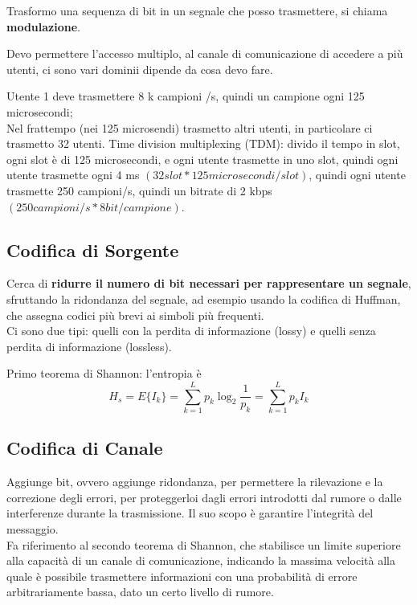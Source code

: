 Trasformo una sequenza di bit in un segnale che posso trasmettere, si chiama \textbf{modulazione}.

Devo permettere l'accesso multiplo, al canale di comunicazione di accedere a più utenti, 
ci sono vari dominii dipende da cosa devo fare. 

Utente 1 deve trasmettere 8 k campioni /s, quindi un campione ogni 125 microsecondi;\\
Nel frattempo (nei 125 microsendi) trasmetto altri utenti, in particolare ci trasmetto 32 utenti.
Time division multiplexing (TDM): divido il tempo in slot, ogni slot è di 125 microsecondi,
e ogni utente trasmette in uno slot, quindi ogni utente trasmette ogni 4 ms $(32 slot * 125 microsecondi/slot)$,
quindi ogni utente trasmette 250 campioni/s, quindi un bitrate di 2 kbps $(250 campioni/s * 8 bit/campione)$.

\subsection{Codifica di Sorgente}
Cerca di \textbf{ridurre il numero di bit necessari per rappresentare un segnale}, sfruttando la
ridondanza del segnale, ad esempio usando la codifica di Huffman, che assegna codici più 
brevi ai simboli più frequenti.\\

Ci sono due tipi: quelli con la perdita di informazione (lossy) e quelli senza perdita 
di informazione (lossless).

Primo teorema di Shannon: l'entropia è 
$$H_s=E\{I_k\}=\sum_{k=1}^{L} p_k \log_2 \frac{1}{p_k}= \sum_{k=1}^{L} p_k I_k$$

\subsection{Codifica di Canale}
Aggiunge bit, ovvero aggiunge ridondanza, per permettere la rilevazione e la 
correzione degli errori, per proteggerloi dagli errori introdotti dal rumore o dalle 
interferenze durante la trasmissione. Il suo scopo è garantire l'integrità del messaggio.\\

Fa riferimento al secondo teorema di Shannon, che stabilisce un limite superiore alla 
capacità di un canale di comunicazione, indicando la massima velocità alla quale è 
possibile trasmettere informazioni con una probabilità di errore arbitrariamente bassa, 
dato un certo livello di rumore.\\

